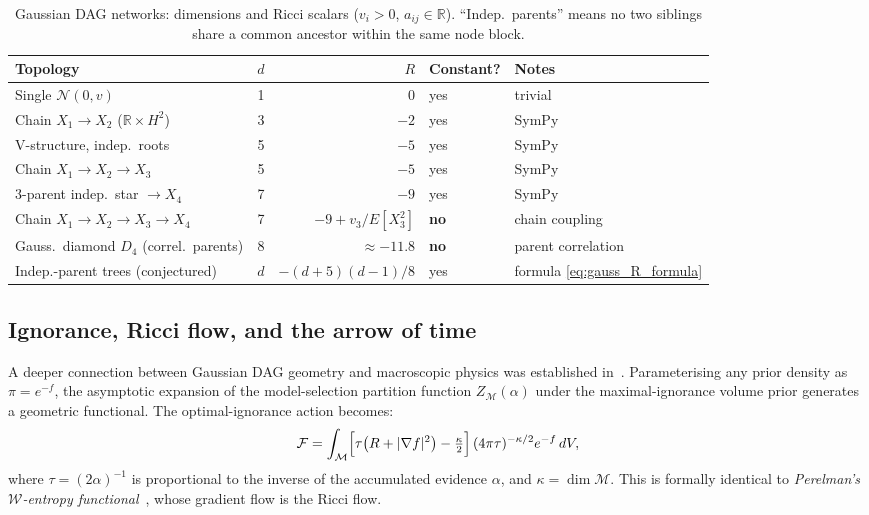 \documentclass[11pt]{article}
\theoremstyle{definition}
\begin{document}
\begin{table}[h]
\centering
\caption{Gaussian DAG networks: dimensions and Ricci scalars ($v_i>0$, $a_{ij}\in\mathbb{R}$).
``Indep.\ parents'' means no two siblings share a common ancestor within the same node block.}
\label{tab:gauss_bitnets}
\begin{tabular}{@{}lrrll@{}}
\toprule
Topology & $d$ & $R$ & Constant? & Notes \\
\midrule
Single $\mathcal{N}(0,v)$ & 1 & $0$ & yes & trivial \\
Chain $X_1 \to X_2$ ($\mathbb{R}\times H^2$) & 3 & $-2$ & yes & SymPy \\
V-structure, indep.\ roots & 5 & $-5$ & yes & SymPy \\
Chain $X_1 \to X_2 \to X_3$ & 5 & $-5$ & yes & SymPy \\
3-parent indep.\ star $\to X_4$ & 7 & $-9$ & yes & SymPy \\
Chain $X_1\to X_2\to X_3\to X_4$ & 7 & $-9 + v_3/E[X_3^2]$ & \textbf{no} & chain coupling \\
Gauss.\ diamond $D_4$ (correl.\ parents) & 8 & $\approx -11.8$ & \textbf{no} & parent correlation \\
Indep.-parent trees (conjectured) & $d$ & $-(d+5)(d-1)/8$ & yes & formula \eqref{eq:gauss_R_formula} \\
\bottomrule
\end{tabular}
\end{table}

\subsection{Ignorance, Ricci flow, and the arrow of time}\label{sec:ricci_flow}

A deeper connection between Gaussian DAG geometry and macroscopic physics 
was established in~\cite{Rod02}.  Parameterising any prior density as 
$\pi = e^{-f}$, the asymptotic expansion of the model-selection partition 
function $Z_{\mathcal{M}}(\alpha)$ under the maximal-ignorance volume 
prior generates a geometric functional.  The optimal-ignorance action becomes:
\begin{equation}\label{eq:W_entropy}
  \mathcal{F} = \int_{\mathcal{M}} 
  \Bigl[\tau\bigl(R + |\nabla f|^2\bigr) - \tfrac{\kappa}{2}\Bigr]\,
  (4\pi\tau)^{-\kappa/2} e^{-f}\,dV,
\end{equation}
where $\tau = (2\alpha)^{-1}$ is proportional to the inverse of the 
accumulated evidence $\alpha$, and $\kappa = \dim\mathcal{M}$.  
This is formally identical to \emph{Perelman's $\mathcal{W}$-entropy 
functional}~\cite{Per02}, whose gradient flow is the Ricci flow.
\end{document}
